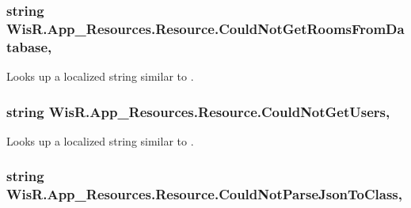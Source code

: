 \subsubsection[{Could\+Not\+Get\+Rooms\+From\+Database}]{\setlength{\rightskip}{0pt plus 5cm}string Wis\+R.\+App\+\_\+\+Resources.\+Resource.\+Could\+Not\+Get\+Rooms\+From\+Database\hspace{0.3cm}{\ttfamily [static]}, {\ttfamily [get]}}\label{class_wis_r_1_1_app___resources_1_1_resource_a2f4ee18b64d2da83bf7e4e78f71c02b7}


Looks up a localized string similar to . 

\hypertarget{class_wis_r_1_1_app___resources_1_1_resource_a16d3e6cb33290716861a18e5b5e16a43}{}
\subsubsection[{Could\+Not\+Get\+Users}]{\setlength{\rightskip}{0pt plus 5cm}string Wis\+R.\+App\+\_\+\+Resources.\+Resource.\+Could\+Not\+Get\+Users\hspace{0.3cm}{\ttfamily [static]}, {\ttfamily [get]}}\label{class_wis_r_1_1_app___resources_1_1_resource_a16d3e6cb33290716861a18e5b5e16a43}


Looks up a localized string similar to . 

\hypertarget{class_wis_r_1_1_app___resources_1_1_resource_a9969e884d28e1923437de6f99006dd16}{}
\subsubsection[{Could\+Not\+Parse\+Json\+To\+Class}]{\setlength{\rightskip}{0pt plus 5cm}string Wis\+R.\+App\+\_\+\+Resources.\+Resource.\+Could\+Not\+Parse\+Json\+To\+Class\hspace{0.3cm}{\ttfamily [static]}, {\ttfamily [get]}}\label{class_wis_r_1_1_app___resources_1_1_resource_a9969e884d28e1923437de6f99006dd16}


